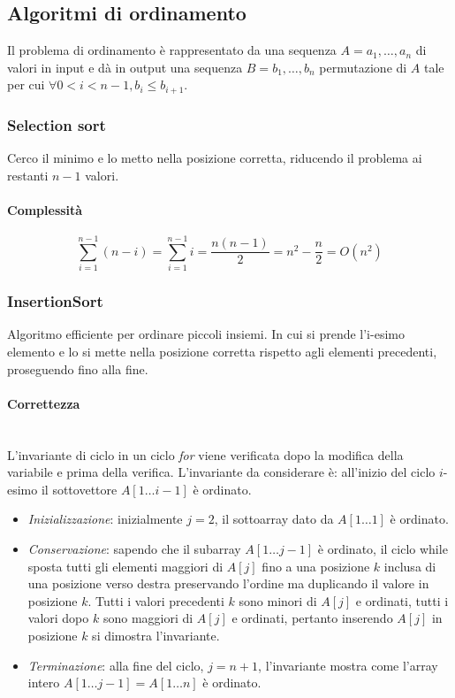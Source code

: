 \subsection{Algoritmi di ordinamento}
Il problema di ordinamento \`e rappresentato da una sequenza $A=a_1, \dots, a_n$ di valori in input e d\`a in output una sequenza $B=b_1, \dots, b_n$ 
permutazione di $A$ tale per cui $\forall 0<i<n-1, b_i\le b_{i+1}$.
\subsubsection{Selection sort}
Cerco il minimo e lo metto nella posizione corretta, riducendo il problema ai restanti $n-1$ valori.



\paragraph{Complessit\`a}
\begin{equation*}
\sum\limits_{i=1}^{n-1}(n-i)=\sum\limits_{i=1}^{n-1}i=\dfrac{n(n-1)}{2}=n^2-\dfrac{n}{2}=O(n^2)
\end{equation*}
\subsubsection{InsertionSort}
Algoritmo efficiente per ordinare piccoli insiemi. In cui si prende l'i-esimo elemento e lo si mette nella posizione corretta rispetto agli elementi
precedenti, proseguendo fino alla fine.

\paragraph{Correttezza}\mbox{}\\
L'invariante di ciclo in un ciclo \emph{for} viene verificata dopo la modifica della variabile e prima della verifica. L'invariante da considerare \`e: all'inizio del ciclo $i$-esimo
il sottovettore $A[1\dots i -1]$ \`e ordinato.
\begin{itemize}
	\item \emph{Inizializzazione}: inizialmente $j=2$, il sottoarray dato da $A[1\dots 1]$ \`e ordinato.
	\item \emph{Conservazione}: sapendo che il subarray $A[1\dots j-1]$ \`e ordinato, il ciclo while sposta tutti gli elementi maggiori di $A[j]$ fino a una posizione $k$ inclusa
		di una posizione verso destra preservando l'ordine ma duplicando il valore in posizione $k$. Tutti i valori precedenti $k$ sono minori di $A[j]$ e ordinati, tutti i 
		valori dopo $k$ sono maggiori di $A[j]$ e ordinati, pertanto inserendo $A[j]$ in posizione $k$ si dimostra l'invariante. 
	\item \emph{Terminazione}: alla fine del ciclo, $j = n + 1$, l'invariante mostra come l'array intero $A[1\dots j - 1] = A[1\dots n]$ \`e ordinato.
\end{itemize}
